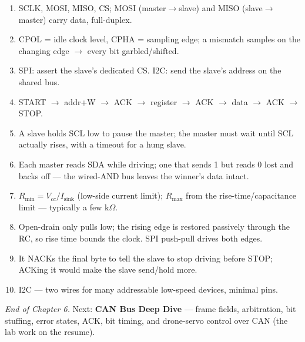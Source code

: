 \begin{answerkey}
\begin{enumerate}
\item SCLK, MOSI, MISO, CS; MOSI (master$\rightarrow$slave) and MISO
  (slave$\rightarrow$master) carry data, full-duplex.
\item CPOL = idle clock level, CPHA = sampling edge; a mismatch samples on the
  changing edge $\rightarrow$ every bit garbled/shifted.
\item SPI: assert the slave's dedicated CS. I2C: send the slave's address on the
  shared bus.
\item START $\rightarrow$ addr+W $\rightarrow$ ACK $\rightarrow$ register
  $\rightarrow$ ACK $\rightarrow$ data $\rightarrow$ ACK $\rightarrow$ STOP.
\item A slave holds SCL low to pause the master; the master must wait until SCL
  actually rises, with a timeout for a hung slave.
\item Each master reads SDA while driving; one that sends 1 but reads 0 lost and
  backs off --- the wired-AND bus leaves the winner's data intact.
\item $R_{\min}=V_{cc}/I_{\text{sink}}$ (low-side current limit);
  $R_{\max}$ from the rise-time/capacitance limit --- typically a few
  k$\Omega$.
\item Open-drain only pulls low; the rising edge is restored passively through
  the RC, so rise time bounds the clock. SPI push-pull drives both edges.
\item It NACKs the final byte to tell the slave to stop driving before STOP;
  ACKing it would make the slave send/hold more.
\item I2C --- two wires for many addressable low-speed devices, minimal pins.
\end{enumerate}
\end{answerkey}

\begin{partnote}
\emph{End of Chapter 6.} Next: \textbf{CAN Bus Deep Dive} --- frame fields,
arbitration, bit stuffing, error states, ACK, bit timing, and drone-servo
control over CAN (the lab work on the resume).
\end{partnote}

